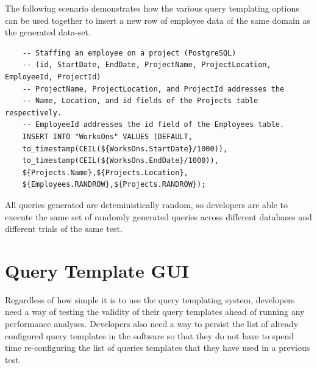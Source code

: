 \documentclass[12pt]{report}
\begin{document}
\begin{spacing}{1.9}
	The following scenario demonstrates how the various query templating options can be used together to insert a new row of employee data of the same domain as the generated data-set.
	
	
	\begin{verbatim}
	-- Staffing an employee on a project (PostgreSQL)
	-- (id, StartDate, EndDate, ProjectName, ProjectLocation, EmployeeId, ProjectId)
	-- ProjectName, ProjectLocation, and ProjectId addresses the 
	-- Name, Location, and id fields of the Projects table respectively.
	-- EmployeeId addresses the id field of the Employees table.
	INSERT INTO "WorksOns" VALUES (DEFAULT, 
	to_timestamp(CEIL(${WorksOns.StartDate}/1000)), 
	to_timestamp(CEIL(${WorksOns.EndDate}/1000)),
	${Projects.Name},${Projects.Location},
	${Employees.RANDROW},${Projects.RANDROW});
	\end{verbatim}
	
	
	
	All queries generated are deteministically random, so developers are able to execute the same set of randomly generated queries across different databases and different trials of the same test.
	
	
	
	\section{Query Template GUI}
	
	Regardless of how simple it is to use the query templating system, developers need a way of testing the validity of their query templates ahead of running any performance analyses. Developers also need a way to persist the list of already configured query templates in the software so that they do not have to spend time re-configuring the list of queries templates that they have used in a previous test.
	

\end{spacing}
\end{document}
